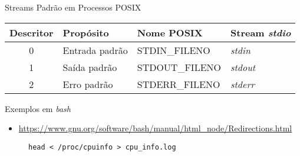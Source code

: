 \documentclass[10pt, compress, aspectratio=169, xcolor={table,usenames,dvipsnames}]{beamer}
\begin{document}
\begin{frame}[label={sec:org3263c57}]{Streams Padrão em Processos POSIX}
\begin{center}
\small
\begin{tabular}{clll}
\toprule
\textbf{Descritor} & \textbf{Propósito} & \textbf{Nome POSIX} &  \textbf{Stream \textit{stdio}}\\
\midrule
0 & Entrada padrão & STDIN\_FILENO & \emph{stdin}\\
1 & Saída padrão & STDOUT\_FILENO & \emph{stdout}\\
2 & Erro padrão & STDERR\_FILENO & \emph{stderr}\\
\bottomrule
\end{tabular}
\end{center}
\end{frame}

\begin{frame}[label={sec:orgac3b82b},fragile]{Exemplos em \emph{bash}}
 \begin{itemize}
\item \url{https://www.gnu.org/software/bash/manual/html\_node/Redirections.html}
\end{itemize}

\begin{figure}
\begin{minipage}{0.6\textwidth}
\begin{verbatim}
head < /proc/cpuinfo > cpu_info.log
\end{verbatim}
\end{minipage}
\end{figure}
\end{frame}

\maketitle
\end{document}

